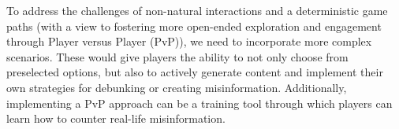 
To address the challenges of non-natural interactions and a deterministic game paths (with a view to fostering more open-ended exploration and engagement through Player versus Player (PvP)), we need to incorporate more complex scenarios. These would give players the ability to not only choose from preselected options, but also to actively generate content and implement their own strategies for debunking or creating misinformation. Additionally, implementing a PvP approach can be a training tool through which players can learn how to counter real-life misinformation.






